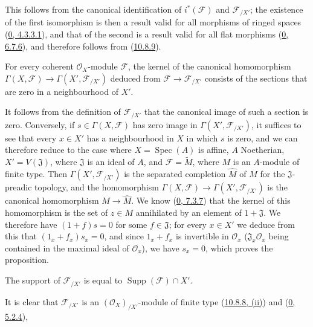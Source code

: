 This follows from the canonical identification of $i^*(\mathscr{F})$ and
$\mathscr{F}_{/X'}$; the existence of the first isomorphism is then a
result valid for all morphisms of ringed spaces
(\hyperref[0.4.3.3.1]{0, 4.3.3.1}), and that of the second is a result
valid for all flat morphisms
(\hyperref[0.6.7.6]{0, 6.7.6}), and therefore follows from
(\hyperref[I.10.8.9]{10.8.9}).

\begin{proposition}[10.8.11]
\label{I.10.8.11}
For every coherent $\mathscr{O}_X$-module $\mathscr{F}$, the kernel of
the canonical homomorphism
$\Gamma(X,\mathscr{F})\to\Gamma(X',\mathscr{F}_{/X'})$ deduced from
$\mathscr{F}\to\mathscr{F}_{/X'}$ consists of the sections that are zero
in a neighbourhood of $X'$.
\end{proposition}

It follows from the definition of $\mathscr{F}_{/X'}$ that the canonical
image of such a section is zero. Conversely, if
$s\in\Gamma(X,\mathscr{F})$ has zero image in
$\Gamma(X',\mathscr{F}_{/X'})$, it suffices to see that every $x\in X'$
has a neighbourhood in $X$ in which $s$ is zero, and we can therefore
reduce to the case where $X=\operatorname{Spec}(A)$ is affine, $A$
Noetherian, $X'=V(\mathfrak{J})$, where $\mathfrak{J}$ is an ideal of
$A$, and $\mathscr{F}=\widetilde M$, where $M$ is an $A$-module of finite
type. Then $\Gamma(X',\mathscr{F}_{/X'})$ is the separated completion
$\widehat M$ of $M$ for the $\mathfrak{J}$-preadic topology, and the
homomorphism $\Gamma(X,\mathscr{F})\to\Gamma(X',\mathscr{F}_{/X'})$ is
the canonical homomorphism $M\to\widehat M$. We know
(\hyperref[0.7.3.7]{0, 7.3.7}) that the kernel of this homomorphism is
the set of $z\in M$ annihilated by an element of $1+\mathfrak{J}$. We
therefore have $(1+f)s=0$ for some $f\in\mathfrak{J}$; for every
$x\in X'$ we deduce from this that $(1_x+f_x)s_x=0$, and since $1_x+f_x$
is invertible in $\mathscr{O}_x$ ($\mathfrak{J}_x\mathscr{O}_x$ being
contained in the maximal ideal of $\mathscr{O}_x$), we have $s_x=0$,
which proves the proposition.

\begin{corollary}[10.8.12]
\label{I.10.8.12}
The support of $\mathscr{F}_{/X'}$ is equal to
$\operatorname{Supp}(\mathscr{F})\cap X'$.
\end{corollary}

It is clear that $\mathscr{F}_{/X'}$ is an
$(\mathscr{O}_X)_{/X'}$-module of finite type
(\hyperref[I.10.8.8]{10.8.8, (ii)}) and
(\hyperref[0.5.2.4]{0, 5.2.4}),

